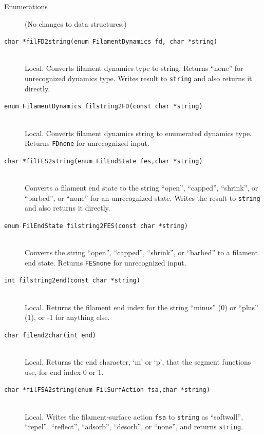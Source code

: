 \documentclass {scrbook}
\newcommand {\ttt} {\texttt}
\begin{document}
\begin{description}

\item[\underline{Enumerations}]
(No changes to data structures.)

\item[\ttt{char *filFD2string(enum FilamentDynamics fd, char *string)}]
\hfill \\
Local. Converts filament dynamics type to string. Returns ``none'' for unrecognized dynamics type. Writes result to \ttt{string} and also returns it directly.

\item[\ttt{enum FilamentDynamics filstring2FD(const char *string)}]
\hfill \\
Local. Converts filament dynamics string to enumerated dynamics type. Returns \ttt{FDnone} for unrecognized input.

\item[\ttt{char *filFES2string(enum FilEndState fes,char *string)}] %
\hfill \\
Converts a filament end state to the string ``open'', ``capped'', ``shrink'', or ``barbed'', or ``none'' for an unrecognized state. Writes the result to \ttt{string} and also returns it directly.

\item[\ttt{enum FilEndState filstring2FES(const char *string)}] %
\hfill \\
Converts the string ``open'', ``capped'', ``shrink'', or ``barbed'' to a filament end state. Returns \ttt{FESnone} for unrecognized input.

\item[\ttt{int filstring2end(const char *string)}] %
\hfill \\
Local. Returns the filament end index for the string ``minus'' (0) or ``plus'' (1), or -1 for anything else.

\item[\ttt{char filend2char(int end)}] %
\hfill \\
Local. Returns the end character, `m' or `p', that the segment functions use, for end index 0 or 1.

\item[\ttt{char *filFSA2string(enum FilSurfAction fsa,char *string)}] %
\hfill \\
Local. Writes the filament-surface action \ttt{fsa} to \ttt{string} as ``softwall'', ``repel'', ``reflect'', ``adsorb'', ``desorb'', or ``none'', and returns \ttt{string}.


\end{description}
\end{document}
